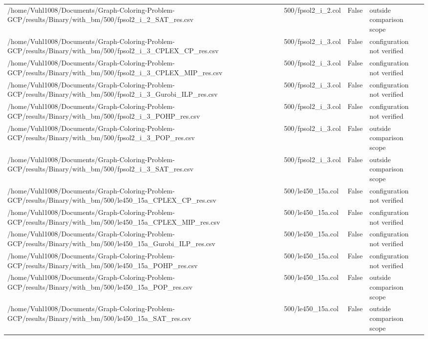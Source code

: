 \begin{table}[htbp]
\begin{tabular}{llll}
/home/Vuhl1008/Documents/Graph-Coloring-Problem-GCP/results/Binary/with\_bm/500/fpsol2\_i\_2\_SAT\_res.csv & 500/fpsol2\_i\_2.col & False & outside comparison scope \\
/home/Vuhl1008/Documents/Graph-Coloring-Problem-GCP/results/Binary/with\_bm/500/fpsol2\_i\_3\_CPLEX\_CP\_res.csv & 500/fpsol2\_i\_3.col & False & configuration not verified \\
/home/Vuhl1008/Documents/Graph-Coloring-Problem-GCP/results/Binary/with\_bm/500/fpsol2\_i\_3\_CPLEX\_MIP\_res.csv & 500/fpsol2\_i\_3.col & False & configuration not verified \\
/home/Vuhl1008/Documents/Graph-Coloring-Problem-GCP/results/Binary/with\_bm/500/fpsol2\_i\_3\_Gurobi\_ILP\_res.csv & 500/fpsol2\_i\_3.col & False & configuration not verified \\
/home/Vuhl1008/Documents/Graph-Coloring-Problem-GCP/results/Binary/with\_bm/500/fpsol2\_i\_3\_POHP\_res.csv & 500/fpsol2\_i\_3.col & False & configuration not verified \\
/home/Vuhl1008/Documents/Graph-Coloring-Problem-GCP/results/Binary/with\_bm/500/fpsol2\_i\_3\_POP\_res.csv & 500/fpsol2\_i\_3.col & False & outside comparison scope \\
/home/Vuhl1008/Documents/Graph-Coloring-Problem-GCP/results/Binary/with\_bm/500/fpsol2\_i\_3\_SAT\_res.csv & 500/fpsol2\_i\_3.col & False & outside comparison scope \\
/home/Vuhl1008/Documents/Graph-Coloring-Problem-GCP/results/Binary/with\_bm/500/le450\_15a\_CPLEX\_CP\_res.csv & 500/le450\_15a.col & False & configuration not verified \\
/home/Vuhl1008/Documents/Graph-Coloring-Problem-GCP/results/Binary/with\_bm/500/le450\_15a\_CPLEX\_MIP\_res.csv & 500/le450\_15a.col & False & configuration not verified \\
/home/Vuhl1008/Documents/Graph-Coloring-Problem-GCP/results/Binary/with\_bm/500/le450\_15a\_Gurobi\_ILP\_res.csv & 500/le450\_15a.col & False & configuration not verified \\
/home/Vuhl1008/Documents/Graph-Coloring-Problem-GCP/results/Binary/with\_bm/500/le450\_15a\_POHP\_res.csv & 500/le450\_15a.col & False & configuration not verified \\
/home/Vuhl1008/Documents/Graph-Coloring-Problem-GCP/results/Binary/with\_bm/500/le450\_15a\_POP\_res.csv & 500/le450\_15a.col & False & outside comparison scope \\
/home/Vuhl1008/Documents/Graph-Coloring-Problem-GCP/results/Binary/with\_bm/500/le450\_15a\_SAT\_res.csv & 500/le450\_15a.col & False & outside comparison scope \\

\end{tabular}
\end{table}
